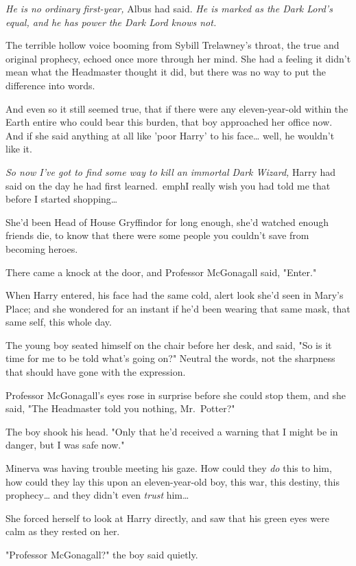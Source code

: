 \emph{He is no ordinary first-year,} Albus had said. \emph{He is marked as the 
Dark Lord's equal, and he has power the Dark Lord knows not.}

The terrible hollow voice booming from Sybill Trelawney's throat, the true and 
original prophecy, echoed once more through her mind. She had a feeling it 
didn't mean what the Headmaster thought it did, but there was no way to put the 
difference into words.

And even so it still seemed true, that if there were any eleven-year-old within 
the Earth entire who could bear this burden, that boy approached her office 
now. And if she said anything at all like 'poor Harry' to his face{\ldots} 
well, he wouldn't like it.

\emph{So now I've got to find some way to kill an immortal Dark Wizard,} Harry 
had said on the day he had first learned.\ emph{I really wish you had told me 
that before I started shopping{\ldots}}

She'd been Head of House Gryffindor for long enough, she'd watched enough 
friends die, to know that there were some people you couldn't save from 
becoming heroes.

There came a knock at the door, and Professor McGonagall said, "Enter."

When Harry entered, his face had the same cold, alert look she'd seen in Mary's 
Place; and she wondered for an instant if he'd been wearing that same mask, 
that same self, this whole day.

The young boy seated himself on the chair before her desk, and said, "So is it 
time for me to be told what's going on?" Neutral the words, not the sharpness 
that should have gone with the expression.

Professor McGonagall's eyes rose in surprise before she could stop them, and 
she said, "The Headmaster told you nothing, Mr.~Potter?"

The boy shook his head. "Only that he'd received a warning that I might be in 
danger, but I was safe now."

Minerva was having trouble meeting his gaze. How could they \emph{do} this to 
him, how could they lay this upon an eleven-year-old boy, this war, this 
destiny, this prophecy{\ldots} and they didn't even \emph{trust} him{\ldots}

She forced herself to look at Harry directly, and saw that his green eyes were 
calm as they rested on her.

"Professor McGonagall?" the boy said quietly.

